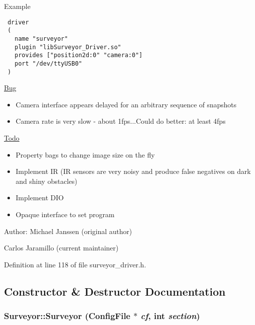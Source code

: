 \begin{Desc}
\item[Example]\end{Desc}


\footnotesize\begin{verbatim}
 driver
 (
   name "surveyor"
   plugin "libSurveyor_Driver.so"
   provides ["position2d:0" "camera:0"]
   port "/dev/ttyUSB0"
 )
 \end{verbatim}
\normalsize


\begin{Desc}
\item[\hyperlink{bug__bug000001}{Bug}]\begin{itemize}
\item Camera interface appears delayed for an arbitrary sequence of snapshots\item Camera rate is very slow - about 1fps...Could do better: at least 4fps\end{itemize}
\end{Desc}
\begin{Desc}
\item[\hyperlink{todo__todo000001}{Todo}]\begin{itemize}
\item Property bags to change image size on the fly\item Implement IR (IR sensors are very noisy and produce false negatives on dark and shiny obstacles)\item Implement DIO\item Opaque interface to set program\end{itemize}
\end{Desc}
\begin{Desc}
\item[Author:]Michael Janssen (original author) 

Carlos Jaramillo (current maintainer) \end{Desc}


Definition at line 118 of file surveyor\_\-driver.h.

\subsection{Constructor \& Destructor Documentation}
\hypertarget{classSurveyor_b0792137ec4760d15de63856ebeb7464}{
\subsubsection[{Surveyor}]{\setlength{\rightskip}{0pt plus 5cm}Surveyor::Surveyor (ConfigFile $\ast$ {\em cf}, \/  int {\em section})}}
\label{classSurveyor_b0792137ec4760d15de63856ebeb7464}


